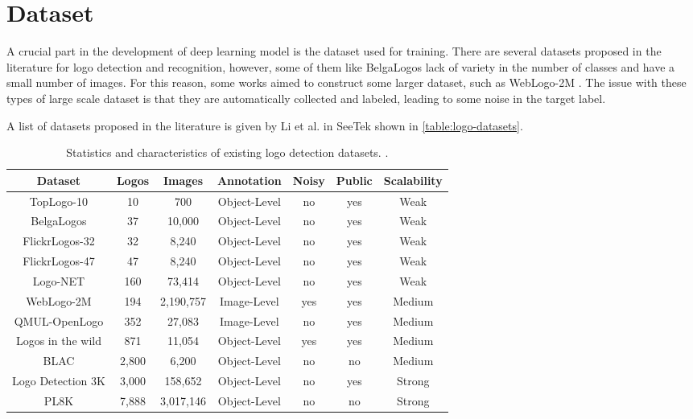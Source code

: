 \chapter{Dataset}
\label{chap:dataset}

A crucial part in the development of deep learning model is the dataset used for training. There are several datasets proposed in the literature for logo detection and recognition, however, some of them like BelgaLogos \cite{neumann2002integration} lack of variety in the number of classes and have a small number of images. For this reason, some works aimed to construct some larger dataset, such as WebLogo-2M \cite{su2017weblogo}. The issue with these types of large scale dataset is that they are automatically collected and labeled, leading to some noise in the target label.

A list of datasets proposed in the literature is given by Li et al. in SeeTek \cite{li2022seetek} shown in \autoref{table:logo-datasets}.

\begin{table}
    \centering
    \begin{tabular}{c || c | c | c | c | c |c} 
     \hline
     \textbf{Dataset} & \textbf{Logos} & \textbf{Images} & \textbf{Annotation} & \textbf{Noisy} & \textbf{Public} & \textbf{Scalability} \\
     \hline
     \hline
     TopLogo-10 & 10 & 700 & Object-Level & no & yes & Weak \\ 
\hline
    BelgaLogos & 37 & 10,000 & Object-Level & no & yes & Weak \\ 
\hline
    FlickrLogos-32 & 32 & 8,240 & Object-Level & no & yes & Weak \\ 
\hline
    FlickrLogos-47 & 47 & 8,240 & Object-Level & no & yes & Weak \\ 
\hline
    Logo-NET & 160 & 73,414 & Object-Level & no & yes & Weak \\ 
\hline
    WebLogo-2M & 194 & 2,190,757 & Image-Level & yes & yes & Medium \\ 
\hline
    QMUL-OpenLogo & 352 & 27,083 & Image-Level & no & yes & Medium \\ 
\hline
    Logos in the wild & 871 & 11,054 & Object-Level & yes & yes & Medium \\ 
\hline
    BLAC & 2,800 & 6,200 & Object-Level & no & no & Medium \\ 
\hline
    Logo Detection 3K & 3,000 & 158,652 & Object-Level & no & yes & Strong \\ 
\hline
    PL8K & 7,888 & 3,017,146 & Object-Level & no & no & Strong \\ 
    \hline

    \end{tabular}
    \caption{Statistics and characteristics of existing logo detection datasets. \cite{li2022seetek}.}
    \label{table:logo-datasets}
\end{table}




